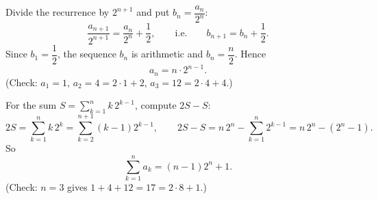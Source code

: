 Divide the recurrence by $2^{n+1}$ and put $b_n=\dfrac{a_n}{2^n}$:
\[\dfrac{a_{n+1}}{2^{n+1}}=\dfrac{a_n}{2^n}+\dfrac12,\qquad\text{i.e.}\qquad b_{n+1}=b_n+\dfrac12.\]
Since $b_1=\dfrac12$, the sequence $b_n$ is arithmetic and $b_n=\dfrac n2$. Hence
\[\boxed{a_n=n\cdot2^{n-1}}.\]
(Check: $a_1=1$, $a_2=4=2\cdot1+2$, $a_3=12=2\cdot4+4$.)

For the sum $S=\displaystyle\sum_{k=1}^{n}k\,2^{k-1}$, compute $2S-S$:
\[2S=\sum_{k=1}^{n}k\,2^{k}=\sum_{k=2}^{n+1}(k-1)2^{k-1},\qquad 2S-S=n\,2^n-\sum_{k=1}^{n}2^{k-1}=n\,2^n-\left(2^n-1\right).\]
So
\[\boxed{\sum_{k=1}^{n}a_k=(n-1)2^n+1}.\]
(Check: $n=3$ gives $1+4+12=17=2\cdot8+1$.)
